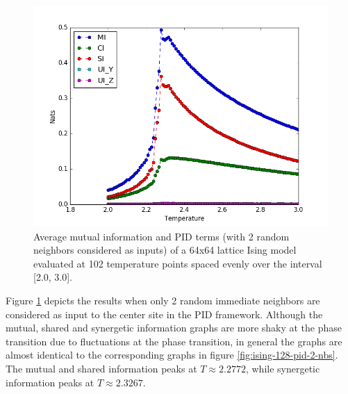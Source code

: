 \documentclass[12pt]{article}
\begin{document}
\begin{figure} [h!]
\begin{center}
\includegraphics[width=\textwidth]{ising-64-pid-2-nbs}
\caption{Average mutual information and PID terms (with 2 random neighbors considered as inputs) of a 64x64 lattice Ising model evaluated at 102 temperature points spaced evenly over the interval [2.0, 3.0].}
\label{fig:ising-64-pid-2-nbs}
\end{center}
\end{figure}

Figure \ref{fig:ising-64-pid-2-nbs} depicts the results when only 2 random immediate neighbors are considered as input to the center site in the PID framework. Although the mutual, shared and synergetic information graphs are more shaky at the phase transition due to fluctuations at the phase transition, in general the graphs are almost identical to the corresponding graphs in figure \ref{fig:ising-128-pid-2-nbs}. The mutual and shared information peaks at $T \approx 2.2772$, while synergetic information peaks at $T \approx 2.3267$.
\end{document}
